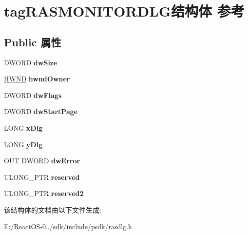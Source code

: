 \hypertarget{structtag_r_a_s_m_o_n_i_t_o_r_d_l_g}{}\section{tag\+R\+A\+S\+M\+O\+N\+I\+T\+O\+R\+D\+L\+G结构体 参考}
\label{structtag_r_a_s_m_o_n_i_t_o_r_d_l_g}
\subsection*{Public 属性}
\begin{DoxyCompactItemize}
\item 
\mbox{\label{structtag_r_a_s_m_o_n_i_t_o_r_d_l_g_a52d856f3b1d0c4999945d602182a8da4}} 
D\+W\+O\+RD {\bfseries dw\+Size}
\item 
\mbox{\label{structtag_r_a_s_m_o_n_i_t_o_r_d_l_g_a7e0fba5ff6a0f7df8c14a7aeb06d7b29}} 
\hyperlink{interfacevoid}{H\+W\+ND} {\bfseries hwnd\+Owner}
\item 
\mbox{\label{structtag_r_a_s_m_o_n_i_t_o_r_d_l_g_a6fbb2edb4407636f57332f4285dc6ac0}} 
D\+W\+O\+RD {\bfseries dw\+Flags}
\item 
\mbox{\label{structtag_r_a_s_m_o_n_i_t_o_r_d_l_g_aac5323c05654b45f731995f9e5f546d2}} 
D\+W\+O\+RD {\bfseries dw\+Start\+Page}
\item 
\mbox{\label{structtag_r_a_s_m_o_n_i_t_o_r_d_l_g_a409cfb31fa9e608e22d06db6c12fd918}} 
L\+O\+NG {\bfseries x\+Dlg}
\item 
\mbox{\label{structtag_r_a_s_m_o_n_i_t_o_r_d_l_g_a11c81b5570a5dd45471420be3c91e10c}} 
L\+O\+NG {\bfseries y\+Dlg}
\item 
\mbox{\label{structtag_r_a_s_m_o_n_i_t_o_r_d_l_g_abca738a85111fcf0916f244e42e34a47}} 
O\+UT D\+W\+O\+RD {\bfseries dw\+Error}
\item 
\mbox{\label{structtag_r_a_s_m_o_n_i_t_o_r_d_l_g_a3d880c5de3f6b9f25cc773e6a2c775d3}} 
U\+L\+O\+N\+G\+\_\+\+P\+TR {\bfseries reserved}
\item 
\mbox{\label{structtag_r_a_s_m_o_n_i_t_o_r_d_l_g_a32726645dd595ef94373a5200259955b}} 
U\+L\+O\+N\+G\+\_\+\+P\+TR {\bfseries reserved2}
\end{DoxyCompactItemize}


该结构体的文档由以下文件生成\+:\begin{DoxyCompactItemize}
\item 
E\+:/\+React\+O\+S-\/0../sdk/include/psdk/rasdlg.\+h\end{DoxyCompactItemize}
